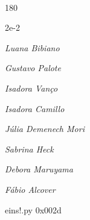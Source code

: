 \documentclass[12pt]{article}
\begin{document}

\pagebreak			

	\ 
	\vfill
	\begin{turn}{180}	
		\begin{minipage}{\textwidth}
		  	\ttfamily %
			\centering
			{\Huge 2e-2}
		  
			\hfill
		  
			

\textit{\small Luana Bibiano}

\textit{\small Gustavo Palote}

\textit{\small Isadora Vanço}

\textit{\small Isadora Camillo}

\textit{\small Júlia Demenech Mori}

\textit{\small Sabrina Heck}

\textit{\small Debora Maruyama}

\textit{\small Fábio Alcover}

\bigskip

eins!.py
0x002d


		\end{minipage}	
	\end{turn}
	\vfill
	\

\pagebreak
\end{document}
